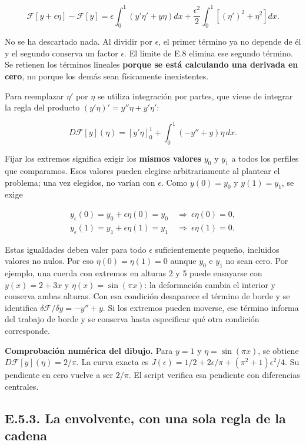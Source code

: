 \documentclass[
  spanish,
  10pt,
  a4paper,
]{article}
\begin{document}
\[
\mathcal F[y+\epsilon\eta]-\mathcal F[y]
=\epsilon\int_0^1(y'\eta'+y\eta)dx
+\frac{\epsilon^2}{2}\int_0^1[(\eta')^2+\eta^2]dx.
\tag{E.10}
\]

No se ha descartado nada. Al dividir por \(\epsilon\), el primer término
ya no depende de él y el segundo conserva un factor \(\epsilon\). El
límite de E.8 elimina ese segundo término. Se retienen los términos
lineales \textbf{porque se está calculando una derivada en cero}, no
porque los demás sean físicamente inexistentes.

Para reemplazar \(\eta'\) por \(\eta\) se utiliza integración por
partes, que viene de integrar la regla del producto
\((y'\eta)'=y''\eta+y'\eta'\):

\[
D\mathcal F[y](\eta)
=[y'\eta]_0^1+\int_0^1(-y''+y)\eta\,dx.
\tag{E.11}
\]

Fijar los extremos significa exigir los \textbf{mismos valores} \(y_0\)
y \(y_1\) a todos los perfiles que comparamos. Esos valores pueden
elegirse arbitrariamente al plantear el problema; una vez elegidos, no
varían con \(\epsilon\). Como \(y(0)=y_0\) y \(y(1)=y_1\), se exige

\[
\begin{aligned}
y_\epsilon(0)=y_0+\epsilon\eta(0)=y_0
&\ \Longrightarrow\ \epsilon\eta(0)=0,\\
y_\epsilon(1)=y_1+\epsilon\eta(1)=y_1
&\ \Longrightarrow\ \epsilon\eta(1)=0.
\end{aligned}\tag{E03.b}
\]

Estas igualdades deben valer para todo \(\epsilon\) suficientemente
pequeño, incluidos valores no nulos. Por eso \(\eta(0)=\eta(1)=0\)
aunque \(y_0\) e \(y_1\) no sean cero. Por ejemplo, una cuerda con
extremos en alturas 2 y 5 puede ensayarse con \(y(x)=2+3x\) y
\(\eta(x)=\sin(\pi x)\): la deformación cambia el interior y conserva
ambas alturas. Con esa condición desaparece el término de borde y se
identifica \(\delta\mathcal F/\delta y=-y''+y\). Si los extremos pueden
moverse, ese término informa del trabajo de borde y se conserva hasta
especificar qué otra condición corresponde.

\textbf{Comprobación numérica del dibujo.} Para \(y=1\) y
\(\eta=\sin(\pi x)\), se obtiene \(D\mathcal F[y](\eta)=2/\pi\). La
curva exacta es \(J(\epsilon)=1/2+2\epsilon/\pi+(\pi^2+1)\epsilon^2/4\).
Su pendiente en cero vuelve a ser \(2/\pi\). El script verifica esa
pendiente con diferencias centrales.

\subsection{E.5.3. La envolvente, con una sola regla de la
cadena}\label{e.5.3.-la-envolvente-con-una-sola-regla-de-la-cadena}
\end{document}
